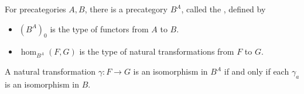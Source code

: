 \documentclass[hott-all.tex]{subfiles}
\begin{document}
\begin{defn}\label{ct:functor-precat}
  For precategories $A,B$, there is a precategory $B^A$, called the , defined by
  \begin{itemize}
  \item $(B^A)_0$ is the type of functors from $A$ to $B$.
  \item $\hom_{B^A}(F,G)$ is the type of natural transformations from $F$ to $G$.
  \end{itemize}
\end{defn}

\begin{lem}\label{ct:natiso}
  A natural transformation $\gamma:F\to G$ is an isomorphism in $B^A$ if and only if each $\gamma_a$ is an isomorphism in $B$.
\end{lem}
%

\end{document}
